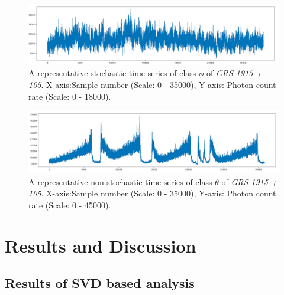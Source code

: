 \documentclass[10pt,conference]{IEEEtran}
\begin{document}
\begin{figure}[ht]
 \centering
 \includegraphics[width=0.9\linewidth]{phi_ts.png}
 \caption{A representative stochastic time series of class $\phi$ of \textit{GRS 1915 + 105}. X-axis:Sample number (Scale: 0 - 35000), Y-axis: Photon count rate (Scale: 0 - 18000). }
 \label{phi_ts}
 \end{figure}

\begin{figure}[ht]
 \centering
 \includegraphics[width=0.8\linewidth]{theta_ts.png}
 \caption{A representative non-stochastic time series of class $\theta$ of \textit{GRS 1915 + 105}. X-axis:Sample number (Scale: 0 - 35000), Y-axis: Photon count rate (Scale: 0 - 45000). }
 \label{theta_ts}
\end{figure}

\section{Results and Discussion}

\subsection{Results of SVD based analysis}


\end{document}
